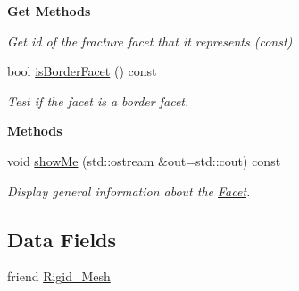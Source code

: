 \begin{Indent}{\bf Get Methods}
\begin{DoxyCompactItemize}
\begin{DoxyCompactList}\small\item\em Get id of the fracture facet that it represents (const) \end{DoxyCompactList}\item 
bool \hyperlink{classFVCode3D_1_1Rigid__Mesh_1_1Facet_af84dc398fca7867ff763bfca119ddc16}{is\+Border\+Facet} () const 
\begin{DoxyCompactList}\small\item\em Test if the facet is a border facet. \end{DoxyCompactList}\end{DoxyCompactItemize}
\end{Indent}
\begin{Indent}{\bf Methods}\par
\begin{DoxyCompactItemize}
\item 
void \hyperlink{classFVCode3D_1_1Rigid__Mesh_1_1Facet_af415677935a5c7a37f12f04fe10abf0d}{show\+Me} (std\+::ostream \&out=std\+::cout) const 
\begin{DoxyCompactList}\small\item\em Display general information about the \hyperlink{classFVCode3D_1_1Rigid__Mesh_1_1Facet}{Facet}. \end{DoxyCompactList}\end{DoxyCompactItemize}
\end{Indent}
\subsection*{Data Fields}
\begin{DoxyCompactItemize}
\item 
friend \hyperlink{classFVCode3D_1_1Rigid__Mesh_1_1Facet_a90c299b74b71dab33ec4057a7a59817f}{Rigid\+\_\+\+Mesh}
\end{DoxyCompactItemize}
